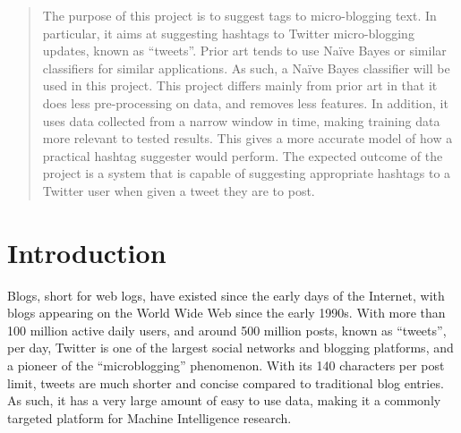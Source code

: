 \documentclass[conference]{IEEEtran}
\begin{document}
\begin{abstract}
The purpose of this project is to suggest tags to micro-blogging text. In particular, it aims at suggesting hashtags to Twitter micro-blogging updates, known as ``tweets''. Prior art tends to use Na\"{i}ve Bayes or similar classifiers for similar applications. As such, a Na\"{i}ve Bayes classifier will be used in this project. This project differs mainly from prior art in that it does less pre-processing on data, and removes less features. In addition, it uses data collected from a narrow window in time, making training data more relevant to tested results. This gives a more accurate model of how a practical hashtag suggester would perform. The expected outcome of the project is a system that is capable of suggesting appropriate hashtags to a Twitter user when given a tweet they are to post.

\end{abstract}






%
\IEEEpeerreviewmaketitle



\section{Introduction}
Blogs, short for web logs, have existed since the early days of the Internet, with blogs appearing on the World Wide Web since the early 1990s. With more than 100 million active daily users, and around 500 million posts, known as ``tweets'', per day, Twitter is one of the largest social networks and blogging platforms, and a pioneer of the ``microblogging'' phenomenon. With its 140 characters per post limit, tweets are much shorter and concise compared to traditional blog entries. As such, it has a very large amount of easy to use data, making it a commonly targeted platform for Machine Intelligence research. \\
\end{document}
